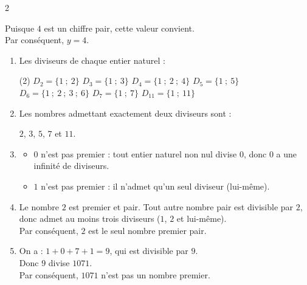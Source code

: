 \documentclass[10pt, a4paper]{article}
\begin{document}
\begin{multicols*}{2}
\begin{Solution}[APPLICATION][6]
\begin{enumerate}[leftmargin=*,itemsep=0.5pt]
    Puisque $4$ est un chiffre pair, cette valeur convient. \\
    Par conséquent, $y = 4$.
\end{enumerate}
\end{Solution}

\begin{Solution}[ACTIVITÉ][2]

\begin{enumerate}[leftmargin=*,itemsep=0.5pt]
    \item Les diviseurs de chaque entier naturel :
\begin{tasks}[label=$\bullet$, label-width=12pt, item-indent=15pt](2)
    \task $D_2 = \big\{1 ~;~ 2\big\}$
    \task $D_3 = \big\{1 ~;~ 3\big\}$
    \task $D_4 = \big\{1 ~;~ 2 ~;~ 4\big\}$
    \task $D_5 = \big\{1 ~;~ 5\big\}$
    \task $D_6 = \big\{1 ~;~ 2 ~;~  3 ~;~ 6\big\}$
    \task $D_7 = \big\{1 ~;~ 7\big\}$
    \task $D_{11} = \big\{1 ~;~ 11\big\}$
\end{tasks}


    \item Les nombres admettant exactement deux diviseurs sont : 
    
    $2$, $3$, $5$, $7$ et $11$.

    \item \begin{itemize}[leftmargin=*,itemsep=0.5pt]
    \item $0$ n'est pas premier : tout entier naturel non nul divise $0$, donc $0$ a une infinité de diviseurs.
    \item $1$ n'est pas premier : il n'admet qu'un seul diviseur (lui-même).
\end{itemize}

    \item Le nombre $2$ est premier et pair. Tout autre nombre pair est divisible par $2$, donc admet au moins trois diviseurs ($1$, $2$ et lui-même). \\
    Par conséquent, $2$ est le seul nombre premier pair.

    \item On a : $1 + 0 + 7 + 1 = 9$, qui est divisible par $9$. \\
    Donc $9$ divise $1071$. \\
    Par conséquent, $1071$ n'est pas un nombre premier.
\end{enumerate}

\end{Solution}


\end{multicols*}
\end{document}
